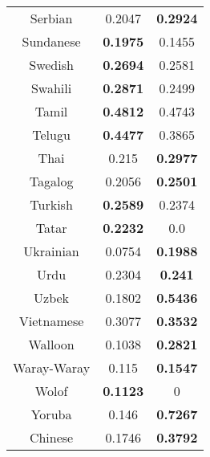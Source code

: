 \begin{figure}[h]
\begin{tabular}{ccc}
Serbian&0.2047&\textbf{0.2924}\\
Sundanese&\textbf{0.1975}&0.1455\\
Swedish&\textbf{0.2694}&0.2581\\
Swahili&\textbf{0.2871}&0.2499\\
Tamil&\textbf{0.4812}&0.4743\\
Telugu&\textbf{0.4477}&0.3865\\
Thai&0.215&\textbf{0.2977}\\
Tagalog&0.2056&\textbf{0.2501}\\
Turkish&\textbf{0.2589}&0.2374\\
Tatar&\textbf{0.2232}&0.0\\
Ukrainian&0.0754&\textbf{0.1988}\\
Urdu&0.2304&\textbf{0.241}\\
Uzbek&0.1802&\textbf{0.5436}\\
Vietnamese&0.3077&\textbf{0.3532}\\
Walloon&0.1038&\textbf{0.2821}\\
Waray-Waray&0.115&\textbf{0.1547}\\
Wolof&\textbf{0.1123}&0\\
Yoruba&0.146&\textbf{0.7267}\\
Chinese&0.1746&\textbf{0.3792}\\
\hline\hline
\end{tabular}
\end{figure}
